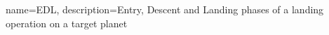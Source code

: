 {
    name=EDL,
    description={Entry, Descent and Landing phases of a landing operation on a target planet}
}